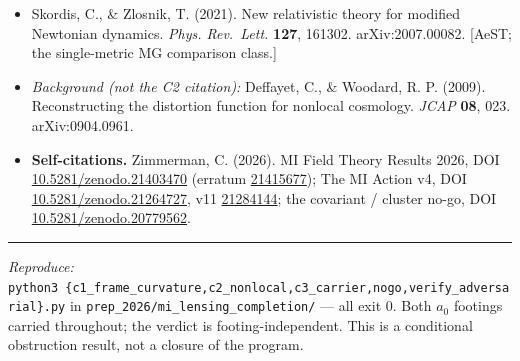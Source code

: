 \documentclass[
]{article}
\begin{document}
\begin{itemize}
  Park, M., et al.~(2026). Solar-System quadrupole constraints on
  modified gravity. arXiv:2602.17884.
\item
  Skordis, C., \& Zlosnik, T. (2021). New relativistic theory for
  modified Newtonian dynamics. \emph{Phys. Rev.~Lett.} \textbf{127},
  161302. arXiv:2007.00082. {[}AeST; the single-metric MG comparison
  class.{]}
\item
  \emph{Background (not the C2 citation):} Deffayet, C., \& Woodard, R.
  P. (2009). Reconstructing the distortion function for nonlocal
  cosmology. \emph{JCAP} \textbf{08}, 023. arXiv:0904.0961.
\item
  \textbf{Self-citations.} Zimmerman, C. (2026). MI Field Theory Results
  2026, DOI
  \href{https://doi.org/10.5281/zenodo.21403470}{10.5281/zenodo.21403470}
  (erratum \href{https://doi.org/10.5281/zenodo.21415677}{21415677});
  The MI Action v4, DOI
  \href{https://doi.org/10.5281/zenodo.21264727}{10.5281/zenodo.21264727},
  v11 \href{https://doi.org/10.5281/zenodo.21284144}{21284144}; the
  covariant / cluster no-go, DOI
  \href{https://doi.org/10.5281/zenodo.20779562}{10.5281/zenodo.20779562}.
\end{itemize}

\begin{center}\rule{0.5\linewidth}{0.5pt}\end{center}

\emph{Reproduce:}
\texttt{python3\ \{c1\_frame\_curvature,c2\_nonlocal,c3\_carrier,nogo,verify\_adversarial\}.py}
in \texttt{prep\_2026/mi\_lensing\_completion/} --- all exit 0. Both
\(a_0\) footings carried throughout; the verdict is footing-independent.
This is a conditional obstruction result, not a closure of the program.
\end{document}

